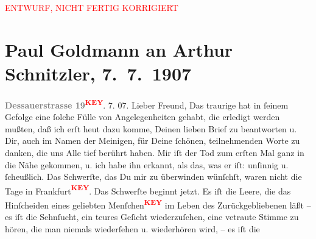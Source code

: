 
\begin{center}
            \textcolor{red}{ENTWURF, NICHT FERTIG KORRIGIERT}
                      \end{center}
            
         \renewcommand{\erwaehnteOrte}{Orte: Berlin, Wien}
         \renewcommand{\erwaehnteWerke}{}
               \section[Paul Goldmann an Arthur Schnitzler, 7. 7. 1907]{ Paul Goldmann an Arthur Schnitzler, 7. 7. 1907}\nopagebreak{}\rehead{ }\begin{ledgroupsized}[t]{13cm}\normalsize\beginnumbering \toendnotes[C]{\smallbreak\pagebreak[2]} 
\toendnotes[C]{\smallbreak}{\pb}\textcolor{gray}{\textbf{ Dessauerstrasse 19}}\textcolor{red}{\textsuperscript{\textbf{KEY}}}. 7. 07. \pend
           \pstart
           \pend
           \pstart
           \pend
           \pstart{}Lieber Freund,\pend\pstart
           \pend
           \pstart
           Das traurige \label{XXXXv}\label{XXXX} hat in ſeinem Gefolge eine ſolche Fülle von
               Angelegenheiten gehabt, die erledigt werden mußten, daß ich erſt heut
               dazu komme, Deinen lieben Brief zu beantworten u. Dir, auch im Namen der Meinigen,
               für Deine ſchönen, teilnehmenden Worte zu danken, die uns Alle tief berührt haben.
               \pend
           \pstart
           Mir iſt der Tod zum erſten Mal ganz in die Nähe gekommen, {\pb} u. ich habe
               ihn erkannt, als das, was er iſt: unſinnig u. ſcheußlich. \pend
           \pstart
           Das Schwerſte, das Du mir zu überwinden wünſchſt, waren nicht die Tage in Frankfurt\textcolor{red}{\textsuperscript{\textbf{KEY}}}. Das Schwerſte beginnt jetzt. Es iſt die Leere,
               die das Hinſcheiden eines geliebten Menſchen\textcolor{red}{\textsuperscript{\textbf{KEY}}} im Leben
               des Zurückgebliebenen läßt – es iſt die Sehnſucht, ein teures Geſicht wiederzuſehen,
               eine vetraute Stimme zu hören, die man niemals wiederſehen u.  wiederhören wird, – {\pb} es iſt die

\end{ledgroupsized}
